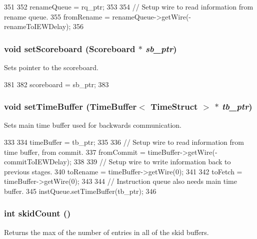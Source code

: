 \begin{DoxyCode}
351 {
352     renameQueue = rq_ptr;
353 
354     // Setup wire to read information from rename queue.
355     fromRename = renameQueue->getWire(-renameToIEWDelay);
356 }
\end{DoxyCode}
\hypertarget{classDefaultIEW_a6f43cb2e5396c650d07ea5e01e855c32}{
\subsubsection[{setScoreboard}]{\setlength{\rightskip}{0pt plus 5cm}void setScoreboard ({\bf Scoreboard} $\ast$ {\em sb\_\-ptr})}}
\label{classDefaultIEW_a6f43cb2e5396c650d07ea5e01e855c32}
Sets pointer to the scoreboard. 


\begin{DoxyCode}
381 {
382     scoreboard = sb_ptr;
383 }
\end{DoxyCode}
\hypertarget{classDefaultIEW_a2b521ea5f191fff72265f60d4ed5187b}{
\subsubsection[{setTimeBuffer}]{\setlength{\rightskip}{0pt plus 5cm}void setTimeBuffer ({\bf TimeBuffer}$<$ {\bf TimeStruct} $>$ $\ast$ {\em tb\_\-ptr})}}
\label{classDefaultIEW_a2b521ea5f191fff72265f60d4ed5187b}
Sets main time buffer used for backwards communication. 


\begin{DoxyCode}
333 {
334     timeBuffer = tb_ptr;
335 
336     // Setup wire to read information from time buffer, from commit.
337     fromCommit = timeBuffer->getWire(-commitToIEWDelay);
338 
339     // Setup wire to write information back to previous stages.
340     toRename = timeBuffer->getWire(0);
341 
342     toFetch = timeBuffer->getWire(0);
343 
344     // Instruction queue also needs main time buffer.
345     instQueue.setTimeBuffer(tb_ptr);
346 }
\end{DoxyCode}
\hypertarget{classDefaultIEW_af64dbc63d9980fb739ed89ddadb2b92e}{
\subsubsection[{skidCount}]{\setlength{\rightskip}{0pt plus 5cm}int skidCount ()}}
\label{classDefaultIEW_af64dbc63d9980fb739ed89ddadb2b92e}
Returns the max of the number of entries in all of the skid buffers. 


